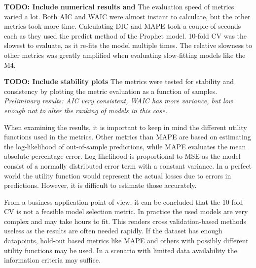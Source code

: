 \documentclass[english, 12pt, a4paper, sci, utf8, a-1b, online]{aaltothesis}
\begin{document}
\textbf{TODO: Include numerical results and } The evaluation speed of metrics varied a lot. Both AIC and WAIC were almost instant to calculate, but the other metrics took more time. Calculating DIC and MAPE took a couple of seconds each as they used the predict method of the Prophet model. 10-fold CV was the slowest to evaluate, as it re-fits the model multiple times. The relative slowness to other metrics was greatly amplified when evaluating slow-fitting models like the M4.

\textbf{TODO: Include stability plots} The metrics were tested for stability and consistency by plotting the metric evaluation as a function of samples. \textit{Preliminary results: AIC very consistent, WAIC has more variance, but low enough not to alter the ranking of models in this case.}


When examining the results, it is important to keep in mind the different utility functions used in the metrics. Other metrics than MAPE are based on estimating the log-likelihood of out-of-sample predictions, while MAPE evaluates the mean absolute percentage error. Log-likelihood is proportional to MSE as the model consist of a normally distributed error term with a constant variance. In a perfect world the utility function would represent the actual losses due to errors in predictions. However, it is difficult to estimate those accurately. 

From a business application point of view, it can be concluded that the 10-fold CV is not a feasible model selection metric. In practice the used models are very complex and may take hours to fit. This renders cross validation-based methods useless as the results are often needed rapidly. If the dataset has enough datapoints, hold-out based metrics like MAPE and others with possibly different utility functions may be used. In a scenario with limited data availability the information criteria may suffice.



\end{document}
